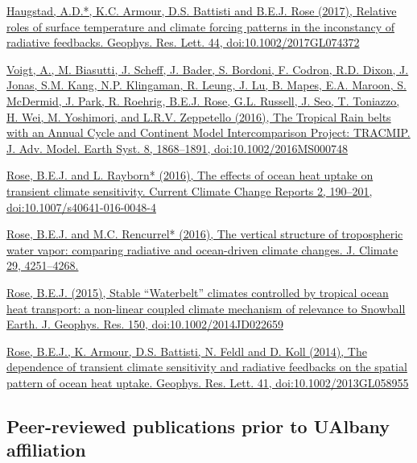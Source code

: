 \documentclass[11pt, letterpaper]{article} %
\newcommand{\years}[1]{\marginnote{\scriptsize #1}} %
\newcommand{\publink}{http://www.atmos.albany.edu/facstaff/brose/resources/Publications/}
\begin{document}
\href{\publink Haugstad_et_al-2017-Geophysical_Research_Letters.pdf}{Haugstad, A.D.*, K.C. Armour, D.S. Battisti and \underline{B.E.J. Rose} (2017), Relative roles of surface temperature and climate forcing patterns in the inconstancy of radiative feedbacks. Geophys. Res. Lett. 44, doi:10.1002/2017GL074372}
\vspace{0.2 cm}

\years{2016}
\href{\publink Voigt_et_al-2016-TRACMIP.pdf}{Voigt, A., M. Biasutti, J. Scheff, J. Bader, S. Bordoni, F. Codron, R.D. Dixon, J. Jonas, S.M. Kang, N.P. Klingaman, R. Leung, J. Lu, B. Mapes, E.A. Maroon, S. McDermid, J. Park, R. Roehrig, \underline{B.E.J. Rose}, G.L. Russell, J. Seo, T. Toniazzo, H. Wei, M. Yoshimori, and L.R.V. Zeppetello (2016), The Tropical Rain belts with an Annual Cycle and Continent Model Intercomparison Project: TRACMIP. J. Adv. Model. Earth Syst. 8, 1868--1891, doi:10.1002/2016MS000748}
\vspace{0.2 cm}
 
\href{\publink Rose_Rayborn_CCCR2016.pdf}{\underline{Rose, B.E.J.} and L. Rayborn* (2016), The effects of ocean heat uptake on transient climate sensitivity. Current Climate Change Reports 2, 190--201, doi:10.1007/s40641-016-0048-4}
\vspace{0.2 cm}
   
\href{\publink Rose_Rencurrel_JClim2016.pdf}{\underline{Rose, B.E.J.} and M.C. Rencurrel* (2016), The vertical structure of tropospheric water vapor: comparing radiative and ocean-driven climate changes. J. Climate 29, 4251--4268.}
\vspace{0.2 cm}
 
\years{2015}  
\href{\publink Rose_JGR2015.pdf}{\underline{Rose, B.E.J.} (2015), Stable ``Waterbelt'' climates controlled by tropical ocean heat transport: a non-linear coupled climate mechanism of relevance to Snowball Earth. J. Geophys. Res. 150, doi:10.1002/2014JD022659}
\vspace{0.2 cm}
 
\years{2014}  
\href{\publink Rose_etal_GRL2014.pdf}{\underline{Rose, B.E.J.}, K. Armour, D.S. Battisti, N. Feldl and D. Koll (2014), The dependence of transient climate sensitivity and radiative feedbacks on the spatial pattern of ocean heat uptake. Geophys. Res. Lett. 41, doi:10.1002/2013GL058955}
  
\subsection*{Peer-reviewed publications prior to UAlbany affiliation} 
 
\end{document}
